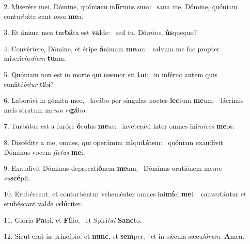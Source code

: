 2. Miserére mei, Dómine, quóni\textbf{am} in\textbf{fír}mus sum: \ast\  sana me, Dómine, quóniam conturbáta sunt \textit{os}\textit{sa} \textbf{me}a.\

3. Et ánima mea tur\textbf{bá}ta est \textbf{val}de: \ast\  sed tu, Dó\textit{mi}\textit{ne}, \textbf{ús}quequo?\

4. Convértere, Dómine, et éripe \textbf{á}nimam \textbf{me}am: \ast\  salvum me fac propter misericór\textit{di}\textit{am} \textbf{tu}am.\

5. Quóniam non est in morte qui \textbf{me}mor sit \textbf{tu}i: \ast\  in inférno autem quis confité\textit{bi}\textit{tur} \textbf{ti}bi?\

6. Laborávi in gémitu meo, \dag\  lavábo per síngulas noctes \textbf{lec}tum \textbf{me}um: \ast\  lácrimis meis stratum me\textit{um} \textit{ri}\textbf{gá}bo.\

7. Turbátus est a furóre \textbf{ó}culus \textbf{me}us: \ast\  inveterávi inter omnes ini\textit{mí}\textit{cos} \textbf{me}os.\

8. Discédite a me, omnes, qui operámini in\textbf{i}qui\textbf{tá}tem: \ast\  quóniam exaudívit Dóminus vocem \textit{fle}\textit{tus} \textbf{me}i.\

9. Exaudívit Dóminus deprecati\textbf{ó}nem \textbf{me}am, \ast\  Dóminus oratiónem me\textit{am} \textit{su}\textbf{scé}pit.\

10. Erubéscant, et conturbéntur veheménter omnes ini\textbf{mí}ci \textbf{me}i: \ast\  convertántur et erubéscant val\textit{de} \textit{ve}\textbf{ló}citer.\

11. Glória \textbf{Pa}tri, et \textbf{Fí}lio, \ast\  et Spirí\textit{tu}\textit{i} \textbf{Sanc}to.\

12. Sicut erat in princípio, et \textbf{nunc}, et \textbf{sem}per, \ast\  et in sǽcula sæcu\textit{ló}\textit{rum}. \textbf{A}men.\

